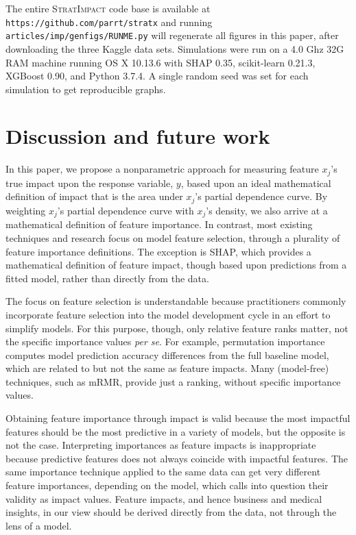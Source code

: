 \documentclass[11pt]{article}
\newcommand{\simp}{\fontfamily{cmr}\textsc{\small StratImpact}}
\begin{document}
The entire \simp{} code base is available at {\tt\small https://github.com/parrt/stratx} and running {\tt\small articles/imp/genfigs/RUNME.py} will regenerate all figures in this paper, after downloading the three Kaggle data sets.  Simulations were run on a 4.0 Ghz 32G RAM machine running OS X 10.13.6 with SHAP 0.35, scikit-learn 0.21.3, XGBoost 0.90, and Python 3.7.4. A single random seed was set for each simulation to get reproducible graphs.

\section{Discussion and future work}\label{sec:discussion}

In this paper, we propose a nonparametric approach for measuring feature $x_j$'s true impact upon the response variable, $y$, based upon an ideal mathematical definition of impact that is the area under $x_j$'s partial dependence curve. By weighting $x_j$'s partial dependence curve with $x_j$'s density, we also arrive at a mathematical definition of feature importance.  In contrast, most existing techniques and research focus on model feature selection, through a plurality of feature importance definitions.   The exception is SHAP, which provides a mathematical definition of feature impact, though based upon predictions from a fitted model, rather than directly from the data.

The focus on feature selection is understandable because practitioners commonly incorporate feature selection into the model development cycle in an effort to simplify models. For this purpose, though, only relative feature ranks matter, not the specific importance values {\em per se}.  For example, permutation importance  computes model prediction accuracy differences from the full baseline model, which are related to but not the same as feature impacts. Many (model-free) techniques, such as mRMR, provide just a ranking, without specific importance values.

Obtaining feature importance through impact is valid because the most impactful features should be the most predictive in a variety of models, but the opposite is not the case.   Interpreting importances as feature impacts is inappropriate because predictive features does not always coincide with impactful features.  The same importance technique applied to the same data can get very different feature importances, depending on the model, which calls into question their validity as impact values.  Feature impacts, and hence business and medical insights,  in our view should be derived directly from the data, not through the lens of a model.
\end{document}
